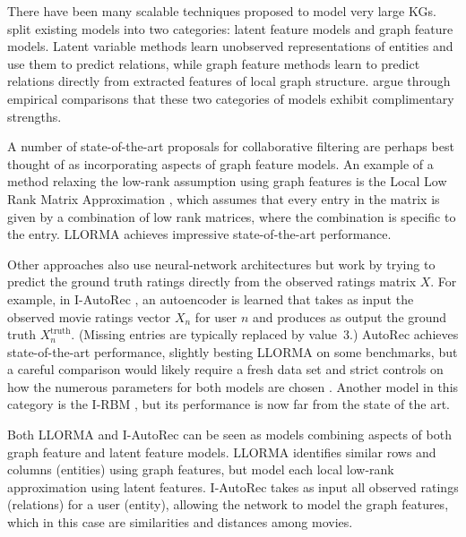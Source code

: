\documentclass{article} \usepackage{iclr2016_conference,times}
\begin{document}
There have been many scalable techniques proposed to model very large KGs.
\citet{NickelMurphy2015} split existing models into two categories: latent feature models and graph feature models. Latent variable methods learn unobserved representations of entities and use them to predict relations,
while graph feature methods learn to predict relations directly from extracted features of local graph structure.
\citet{TC2015} argue through empirical comparisons that these two categories of models exhibit complimentary strengths.

A number of state-of-the-art proposals for collaborative filtering are perhaps best thought of as incorporating aspects of  graph feature models.
An example of a method relaxing the low-rank assumption using graph features is the Local Low Rank Matrix Approximation \citep{LLORMA}, which assumes that every entry in the matrix is given by a combination of low rank matrices, where the combination is specific to the entry.
LLORMA achieves impressive state-of-the-art performance.

Other approaches also use neural-network architectures but work by trying to predict the ground truth ratings directly from the observed ratings matrix $X$.  For example,
in I-AutoRec \citep{AutoRec}, an autoencoder is learned that takes as input the observed movie ratings vector $X_n$ for user $n$ and produces as output the ground truth $X^{\textrm{truth}}_n$. (Missing entries are typically replaced by value~3.)
AutoRec achieves state-of-the-art performance, slightly besting LLORMA on some benchmarks, but a careful comparison would likely require a fresh data set and strict controls on how the numerous parameters for both models are chosen \citep{BH15,Dwork07082015}.
Another model in this category is the I-RBM \citep{I-RBM}, but its performance is now far from the state of the art.

Both LLORMA and I-AutoRec can be seen as models combining aspects of both graph feature and latent feature models. 
LLORMA identifies similar rows and columns (entities) using graph features, but model each local low-rank approximation using latent features. 
I-AutoRec takes as input all observed ratings (relations) for a user (entity), allowing the network to model the graph features, which in this case are similarities and distances among movies.
\end{document}
